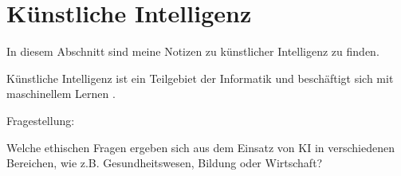 \section{Künstliche Intelligenz}
\label{sec:ai}

In diesem Abschnitt sind meine Notizen zu künstlicher Intelligenz zu finden.

Künstliche Intelligenz ist ein Teilgebiet der Informatik und beschäftigt sich mit maschinellem Lernen \citep{ai-wikipedia}.

Fragestellung:

Welche ethischen Fragen ergeben sich aus dem Einsatz von KI in verschiedenen Bereichen, wie z.B. Gesundheitswesen, Bildung oder Wirtschaft?